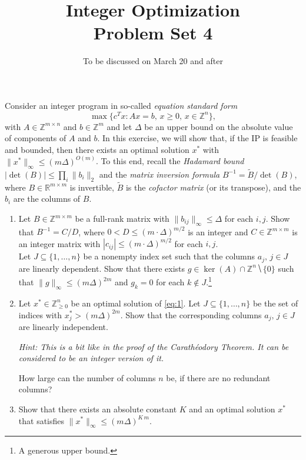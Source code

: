 \documentclass[11pt,a4paper]{article}
\title{Integer Optimization  \\ Problem Set 4 }
\date{To be discussed on March 20 and after}
\newcommand{\wt}[1]{\widetilde{#1}}
\begin{document}
\maketitle 

\noindent 
Consider an integer program in so-called \emph{equation standard form}
  \begin{equation}\label{eq:1}
    \max \{ c^T x : Ax = b, \, x≥0, \, x ∈ ℤ^n\}, 
  \end{equation}
  with $A ∈ℤ^{m ×n}$ and $b∈ℤ^m$ and let $Δ$ be an upper bound on the
  absolute value of components of $A$ and $b$. In this exercise, we
  will show that, if the IP is feasible and bounded, then there exists
  an optimal solution $x^*$ with $\|x^*\|_∞ ≤ (m Δ)^{O(m)}$.  To this end,
  recall the \emph{Hadamard bound } $|\det(B)| ≤ ∏_i \|b_i\|_2$ and
  the \emph{matrix inversion formula} $B^{-1} = \wt{B} / \det(B)$,
  where $B ∈ℝ^{m × m}$ is invertible, $\wt{B}$ is the \emph{cofactor
    matrix} (or its transpose), and the $b_i$ are the columns of $B$.

\begin{enumerate} 
\item Let $B ∈ℤ^{m × m}$ be a full-rank matrix with $\|b_{ij}\|_∞ ≤ Δ$
  for each $i,j$. Show that $B^{-1} = C / D$, where
  $0< D ≤ (m ⋅Δ)^{m/2}$ is an integer and $C ∈ ℤ^{m ×m}$ is an integer
  matrix with $|c_{ij}| ≤ (m ⋅Δ)^{m/2}$ for each $i,j$.
\\ Let $J ⊆ \{1,\dots,n\}$ be a nonempty index set such that the
  columns $a_j, \, j ∈ J$ are linearly dependent. Show that there
  exists $g ∈ \ker(A) ∩ ℤ^n ⧹\{0\}$ such that
  $\|g\|_∞ ≤ (m Δ)^{2m}$
  and $g_k = 0$ for each $k ∉ J$.\footnote{A generous upper bound.} 
\item
  Let $x^* ∈ℤ^{n}_{≥0}$ be an optimal solution of \eqref{eq:1}. Let $J ⊆ \{1,\dots,n\}$ be the set of indices  with $x^*_j > (m Δ)^{2m}$. Show that the corresponding columns $a_j, \, j ∈ J$ are linearly independent.

  \emph{Hint: This is a bit like in the proof of the Carathéodory Theorem. It can be considered to be an integer version of it. } 

How large can the number of columns $n$ be, if there are no redundant columns?

\item Show that there exists an absolute constant $K$ and an optimal solution $x^*$ that satisfies  $\|x^*\|_∞ ≤ (m Δ)^{K \, m}$. 
\end{enumerate}

\newpage
\end{document}
